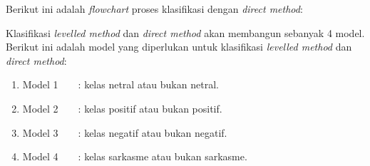 \begin{adjustbox}{width=1\textwidth}
\begin{minipage}{\linewidth}
\end{minipage}
\end{adjustbox}

Berikut ini adalah \textit{flowchart }proses klasifikasi dengan \textit{direct method}:

\begin{adjustbox}{width=1\textwidth}
\begin{minipage}{\linewidth}
\end{minipage}
\end{adjustbox}

Klasifikasi \textit{levelled method} dan \textit{direct method }akan membangun sebanyak 4 model. Berikut ini adalah model yang diperlukan untuk klasifikasi \textit{levelled method }dan \textit{direct method}:

\begin{enumerate}[leftmargin=*]
	\item Model 1\ \ \ \ : kelas netral atau bukan netral.
	\item Model 2\ \ \ \ : kelas positif atau bukan positif.
	\item Model 3\ \ \ \ : kelas negatif atau bukan negatif.
	\item Model 4\ \ \ \ : kelas sarkasme atau bukan sarkasme.
\end{enumerate}


